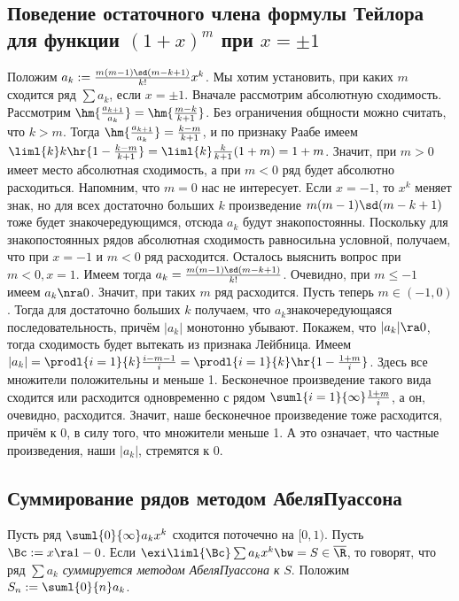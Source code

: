 \documentclass[a4paper]{article}
\begin{document}
\subsection{Поведение остаточного члена формулы Тейлора для функции $(1+x)^m$ при $x=\pm 1$}

Положим $a_k := \frac{m(m-1)\sd(m-k+1)}{k!}x^k$. Мы хотим установить, при каких $m$ сходится ряд $\sum a_k$, если
$x =\pm 1$. Вначале рассмотрим абсолютную сходимость. Рассмотрим $\hm{\frac{a_{k+1}}{a_k}} = \hm{\frac{m-k}{k+1}}$.
Без ограничения общности можно считать, что $k > m$. Тогда $\hm{\frac{a_{k+1}}{a_k}} = \frac{k-m}{k+1}$, и по
признаку Раабе имеем $\liml{k} k\hr{ 1-\frac{k-m}{k+1}} =\liml{k} \frac{k}{k+1}(1+m) = 1+m$. Значит, при $m > 0$
имеет место абсолютная сходимость, а при $m < 0$ ряд будет абсолютно расходиться. Напомним, что $m=0$ нас не
интересует. Если $x=-1$, то $x^k$ меняет знак, но для всех достаточно больших $k$ произведение $m(m-1)\sd(m-k+1)$
тоже будет знакочередующимся, отсюда $a_k$ будут знакопостоянны. Поскольку для знакопостоянных рядов абсолютная
сходимость равносильна условной, получаем, что при $x=-1$ и $m < 0$ ряд расходится. Осталось выяснить вопрос
при $m < 0, x=1$. Имеем тогда $a_k =\frac{m(m-1)\sd(m-k+1)}{k!}$. Очевидно, при $m \le -1$ имеем $a_k \nra 0$.
Значит, при таких $m$ ряд расходится. Пусть теперь $m \in (-1,0)$. Тогда для достаточно больших $k$ получаем, что
$a_k$\т знакочередующаяся последовательность, причём $|a_k|$ монотонно убывают. Покажем, что $|a_k| \ra 0$, тогда
сходимость будет вытекать из признака Лейбница. Имеем $|a_k| = \prodl{i=1}{k}\frac{i-m-1}{i}=
\prodl{i=1}{k}\hr{1-\frac{1+m}{i}} $. Здесь все множители положительны и меньше 1. Бесконечное
произведение такого вида сходится или расходится одновременно с рядом $\suml{i=1}{\infty} \frac{1+m}{i}$, а он,
очевидно, расходится. Значит, наше бесконечное произведение тоже расходится, причём к 0, в силу того, что
множители меньше 1. А это означает, что частные произведения,  наши $|a_k|$, стремятся к 0.

\subsection{Суммирование рядов методом Абеля\ч Пуассона}

\begin{df}
Пусть ряд $\suml{0}{\infty} a_k x^k$ сходится поточечно на $[0,1)$. Пусть $\Bc := x \ra 1-0$. Если
$\exi \liml{\Bc} \sum a_k x^k\bw=S \in \overline{\R}$,
то говорят, что ряд $\sum a_k$ \emph{суммируется методом Абеля\ч Пуассона к} $S$. Положим $S_n := \suml{0}{n}a_k$.
\end{df}
\end{document}
